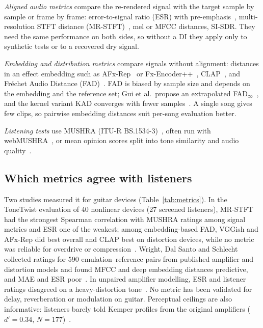 \emph{Aligned audio metrics} compare the re-rendered signal with the target
sample by sample or frame by frame: error-to-signal ratio (ESR) with
pre-emphasis~\cite{wright2020perceptual}, multi-resolution STFT distance
(MR-STFT)~\cite{yamamoto2020parallel,steinmetz2020auraloss}, mel or MFCC
distances, SI-SDR. They need the same performance on both sides, so without a
DI they apply only to synthetic tests or to a recovered dry signal.

\emph{Embedding and distribution metrics} compare signals without alignment:
distances in an effect embedding such as AFx-Rep~\cite{steinmetz2024stito} or
Fx-Encoder++~\cite{yeh2025fxencoder}, CLAP~\cite{wu2023laionclap}, and Fréchet
Audio Distance (FAD)~\cite{kilgour2019fad}. FAD is biased by sample size and
depends on the embedding and the reference set; Gui et al.\ propose an
extrapolated FAD$_\infty$~\cite{gui2024adapting}, and the kernel variant KAD
converges with fewer samples~\cite{chung2025kad}. A single song gives few
clips, so pairwise embedding distances suit per-song evaluation better.

\emph{Listening tests} use MUSHRA (ITU-R BS.1534-3)~\cite{itu2015bs1534}, often
run with webMUSHRA~\cite{schoeffler2018webmushra}, or mean opinion scores split
into tone similarity and audio quality~\cite{yeh2026egvae}.

\subsection{Which metrics agree with listeners}

Two studies measured it for guitar devices (Table~\ref{tab:metrics}). In the
ToneTwist evaluation of 40 nonlinear devices (27 screened listeners),
MR-STFT had the strongest Spearman correlation with MUSHRA ratings among
signal metrics and ESR one of the weakest; among embedding-based FAD, VGGish
and AFx-Rep did best overall and CLAP best on distortion devices, while no
metric was reliable for overdrive or compression~\cite{comunita2025differentiable}.
Wright, Dal Santo and Schlecht collected ratings for 590 emulation--reference
pairs from published amplifier and distortion models and found MFCC and deep
embedding distances predictive, and MAE and ESR poor~\cite{wright2026predicting}.
In unpaired amplifier modelling, ESR and listener ratings disagreed on a
heavy-distortion tone~\cite{wright2023adversarial}. No metric has been
validated for delay, reverberation or modulation on guitar. Perceptual
ceilings are also informative: listeners barely told Kemper profiles from the
original amplifiers ($d' = 0.34$, $N = 177$)~\cite{duvel2020confusingly}.

